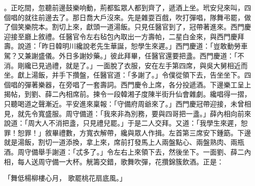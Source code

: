 。正吃間，忽聽前邊鼓樂响動，荊都監眾人都到齊了，遞酒上坐。玳安兒來叫，四個唱的就往前邊去了。那日喬大戶沒來。先是雜耍百戲，吹打彈唱，隊舞弔罷，做了個笑樂院本。割切上來，獻頭一道湯飯。只見任醫官到了，冠帶著進來。西門慶迎接至廳上敘禮。任醫官令左右毡包內取出一方壽帕，二星白金來，與西門慶拜壽。說道：「昨日韓明川纔說老先生華誕，恕學生來遲。」西門慶道：「豈敢動勞車駕？又兼謝盛儀。外日多謝妙藥。」彼此拜畢，任醫官還要把盞。西門慶道：「不消。剛纔已見過禮，就是了。」一面脫了衣服，安在左手第四席，與吳大舅相近而坐。獻上湯飯，并手下攢盤，任醫官道：「多謝了。」令僕從領下去，告坐坐下。四個唱的彈著樂器，在旁唱了一套壽詞。西門慶令上席，各分投遞酒。下邊樂工呈上揭帖，到劉、薛二內相席前。揀令一段韓湘子度陳半街升仙會雜劇。纔唱得一摺，只聽喝道之聲漸近。平安進來稟報：「守備府周爺來了。」西門慶冠帶迎接，未曾相見，就先令寬盛服。周守備道：「我來非為別務，要與四哥把一盞。」薛內相向前來說道：「周大人不消把盞，只見禮兒罷。」于是二人交拜。又道：「我學生來遲，恕罪！恕罪！」敘畢禮數，方寬衣解帶，纔與眾人作揖。左首第三席安下鍾筯。下邊就是湯飯，割切一道添換，拿上來，席前打發馬上人兩盤點心、兩盤熟肉、兩瓶酒。周守備舉手謝道：「忒多了。」令左右上來領下去，然後坐下。一面劉、薛二內相，每人送周守備一大杯。觥籌交錯，歌舞吹彈，花攢錦簇飲酒。正是：

「舞低楊柳樓心月，  歌罷桃花扇底風。」

